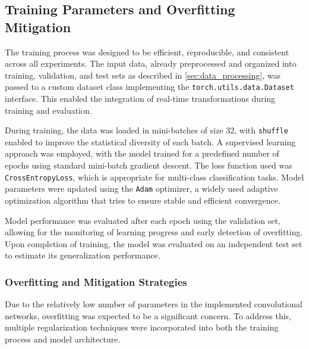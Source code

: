 \documentclass[journal,article,submit,pdftex,moreauthors]{Definitions/mdpi}
\begin{document}
\subsection{Training Parameters and Overfitting Mitigation}

The training process was designed to be efficient, reproducible, and consistent across all experiments. The input data, already preprocessed and organized into training, validation, and test sets as described in \autoref{sec:data_processing}, was passed to a custom dataset class implementing the \texttt{torch.utils.data.Dataset} interface. This enabled the integration of real-time transformations during training and evaluation.

During training, the data was loaded in mini-batches of size 32, with \texttt{shuffle} enabled to improve the statistical diversity of each batch. A supervised learning approach was employed, with the model trained for a predefined number of epochs using standard mini-batch gradient descent. The loss function used was \texttt{CrossEntropyLoss}, which is appropriate for multi-class classification tasks. Model parameters were updated using the \texttt{Adam} optimizer, a widely used adaptive optimization algorithm that tries to ensure stable and efficient convergence.

Model performance was evaluated after each epoch using the validation set, allowing for the monitoring of learning progress and early detection of overfitting. Upon completion of training, the model was evaluated on an independent test set to estimate its generalization performance.

\subsubsection{Overfitting and Mitigation Strategies}

Due to the relatively low number of parameters in the implemented convolutional networks, overfitting was expected to be a significant concern. To address this, multiple regularization techniques were incorporated into both the training process and model architecture.
\end{document}
